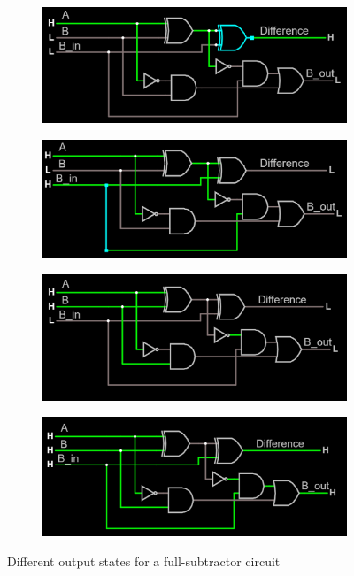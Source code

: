 \documentclass{article}
\begin{document}
\begin{figure}[H]
		\begin{subfigure}[b]{0.4\textwidth}
			\centering
			\includegraphics[width=\textwidth]{full_sub/full_sub_100.png}
		\end{subfigure}
		\begin{subfigure}[b]{0.4\textwidth}
			\includegraphics[width=\textwidth]{full_sub/full_sub_101.png}
		\end{subfigure}
		
		\begin{subfigure}[b]{0.4\textwidth}
			\centering
			\includegraphics[width=\textwidth]{full_sub/full_sub_110.png}
		\end{subfigure}
		\begin{subfigure}[b]{0.4\textwidth}
			\includegraphics[width=\textwidth]{full_sub/full_sub_111.png}
		\end{subfigure}
		\caption{Different output states for a full-subtractor circuit}
		\label{fig:fulladder}
	\end{figure}
	
\end{document}
